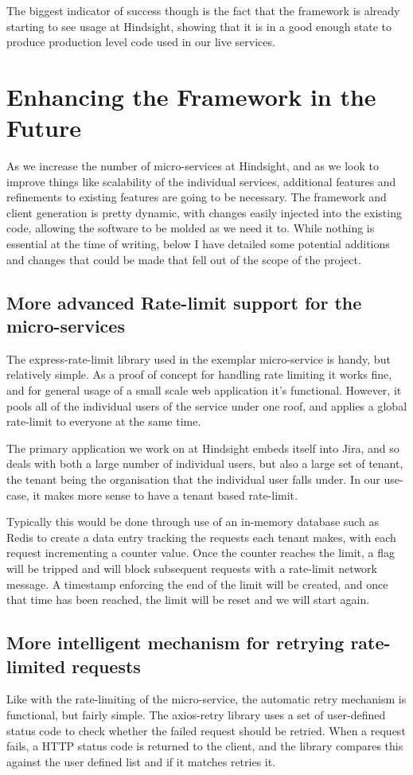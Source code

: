 The biggest indicator of success though is the fact that the framework is already starting to see usage at Hindsight, showing that it is in a good enough state to produce production level code used in our live services.

\section{Enhancing the Framework in the Future}
As we increase the number of micro-services at Hindsight, and as we look to improve things like scalability of the individual services, additional features and refinements to existing features are going to be necessary. The framework and client generation is pretty dynamic, with changes easily injected into the existing code, allowing the software to be molded as we need it to. While nothing is essential at the time of writing, below I have detailed some potential additions and changes that could be made that fell out of the scope of the project.
\subsection{More advanced Rate-limit support for the micro-services}
The express-rate-limit library used in the exemplar micro-service is handy, but relatively simple. As a proof of concept for handling rate limiting it works fine, and for general usage of a small scale web application it's functional. However, it pools all of the individual users of the service under one roof, and applies a global rate-limit to everyone at the same time.

The primary application we work on at Hindsight embeds itself into Jira, and so deals with both a large number of individual users, but also a large set of tenant, the tenant being the organisation that the individual user falls under. In our use-case, it makes more sense to have a tenant based rate-limit.

Typically this would be done through use of an in-memory database such as Redis to create a data entry tracking the requests each tenant makes, with each request incrementing a counter value. Once the counter reaches the limit, a flag will be tripped and will block subsequent requests with a rate-limit network message. A timestamp enforcing the end of the limit will be created, and once that time has been reached, the limit will be reset and we will start again.
\subsection{More intelligent mechanism for retrying rate-limited requests}
Like with the rate-limiting of the micro-service, the automatic retry mechanism is functional, but fairly simple. The axios-retry library uses a set of user-defined status code to check whether the failed request should be retried. When a request fails, a HTTP status code is returned to the client, and the library compares this against the user defined list and if it matches retries it. 

